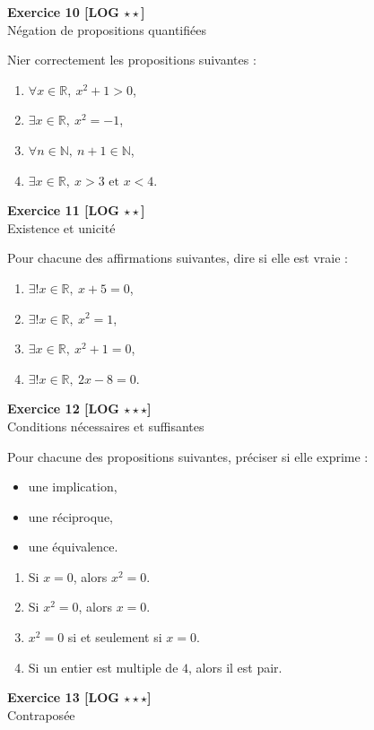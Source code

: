 \documentclass[11pt,a4paper]{article}
\newcommand{\R}{\mathbb{R}}
\newcommand{\N}{\mathbb{N}}
\begin{document}
\textbf{Exercice 10 [LOG \(\star\star\)]}\\
Négation de propositions quantifiées

Nier correctement les propositions suivantes :
\begin{enumerate}[label=\alph*)]
    \item \(\forall x\in\R,\ x^2+1>0\),
    \item \(\exists x\in\R,\ x^2=-1\),
    \item \(\forall n\in\N,\ n+1\in\N\),
    \item \(\exists x\in\R,\ x>3 \text{ et } x<4\).
\end{enumerate}

\textbf{Exercice 11 [LOG \(\star\star\)]}\\
Existence et unicité

Pour chacune des affirmations suivantes, dire si elle est vraie :
\begin{enumerate}[label=\alph*)]
    \item \(\exists! x\in \R,\ x+5=0\),
    \item \(\exists! x\in \R,\ x^2=1\),
    \item \(\exists x\in \R,\ x^2+1=0\),
    \item \(\exists! x\in \R,\ 2x-8=0\).
\end{enumerate}

\textbf{Exercice 12 [LOG \(\star\star\star\)]}\\
Conditions nécessaires et suffisantes

Pour chacune des propositions suivantes, préciser si elle exprime :
\begin{itemize}
    \item une implication,
    \item une réciproque,
    \item une équivalence.
\end{itemize}

\begin{enumerate}[label=\alph*)]
    \item Si \(x=0\), alors \(x^2=0\).
    \item Si \(x^2=0\), alors \(x=0\).
    \item \(x^2=0\) si et seulement si \(x=0\).
    \item Si un entier est multiple de \(4\), alors il est pair.
\end{enumerate}

\textbf{Exercice 13 [LOG \(\star\star\star\)]}\\
Contraposée
\end{document}
